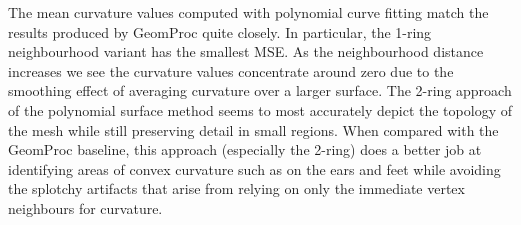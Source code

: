 \documentclass{article}
\begin{document}

The mean curvature values computed with polynomial curve fitting match the results
produced by GeomProc quite closely. In particular, the 1-ring neighbourhood
variant has the smallest MSE. As the neighbourhood distance increases we see
the curvature values concentrate around zero due to the smoothing effect of
averaging curvature over a larger surface. The 2-ring approach of the polynomial
surface method seems to most accurately depict the topology of the mesh while
still preserving detail in small regions. When compared with the GeomProc
baseline, this approach (especially the 2-ring) does a better job at identifying
areas of convex curvature such as on the ears and feet while avoiding the
splotchy artifacts that arise from relying on only the immediate vertex
neighbours for curvature.

\pagebreak
\end{document}
